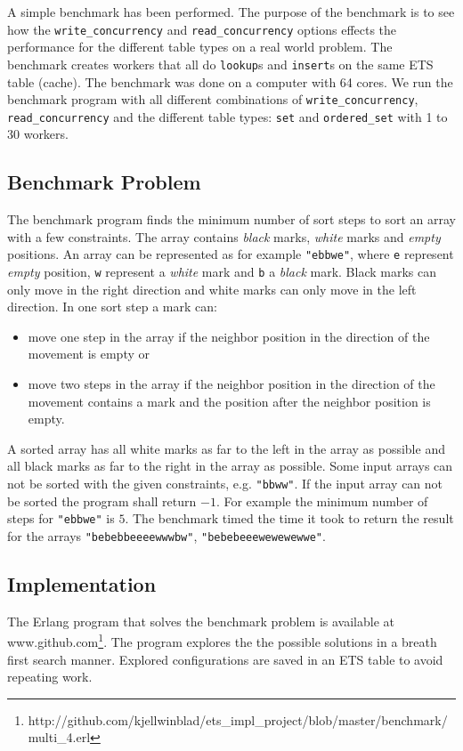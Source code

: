 \documentclass[aps,pre,preprint,nofootinbib]{revtex4}
\begin{document}
  A simple benchmark has been performed.
  The purpose of the benchmark is to see how the \verb|write_concurrency| and \verb|read_concurrency| options effects the performance for the different table types on a real world problem.
  The benchmark creates workers that all do \verb|lookup|s and \verb|insert|s on the same ETS table (cache).
  The benchmark was done on a computer with 64 cores.
  We run the benchmark program with all different combinations of \verb|write_concurrency|, \verb|read_concurrency| and the different table types: \verb|set| and \verb|ordered_set| with 1 to 30 workers.
  
  \subsection{Benchmark Problem}
    The benchmark program finds the minimum number of sort steps to sort an array with a few constraints.
    The array contains \emph{black} marks, \emph{white} marks and \emph{empty} positions.
    An array can be represented as for example \verb|"ebbwe"|, where \verb|e| represent \emph{empty} position, \verb|w| represent a \emph{white} mark and \verb|b| a \emph{black} mark.
    Black marks can only move in the right direction and white marks can only move in the left direction.
    In one sort step a mark can:
    \begin{itemize}
     \item move one step in the array if the neighbor position in the direction of the movement is empty or
     \item move two steps in the array if the neighbor position in the direction of the movement contains a mark and the position after the neighbor position is empty.
    \end{itemize}
    A sorted array has all white marks as far to the left in the array as possible and all black marks as far to the right in the array as possible.
    Some input arrays can not be sorted with the given constraints, e.g. \verb|"bbww"|.
    If the input array can not be sorted the program shall return $-1$.
    For example the minimum number of steps for \verb|"ebbwe"| is $5$.
    The benchmark timed the time it took to return the result for the arrays \verb|"bebebbeeeewwwbw"|, \verb|"bebebeeewewewewwe"|.
    
  \subsection{Implementation}
    The Erlang program that solves the benchmark problem is available at www.github.com\footnote{http://github.com/kjellwinblad/ets\_impl\_project/blob/master/benchmark/multi\_4.erl}.
    The program explores the the possible solutions in a breath first search manner.
    Explored configurations are saved in an ETS table to avoid repeating work.
    
\end{document}

